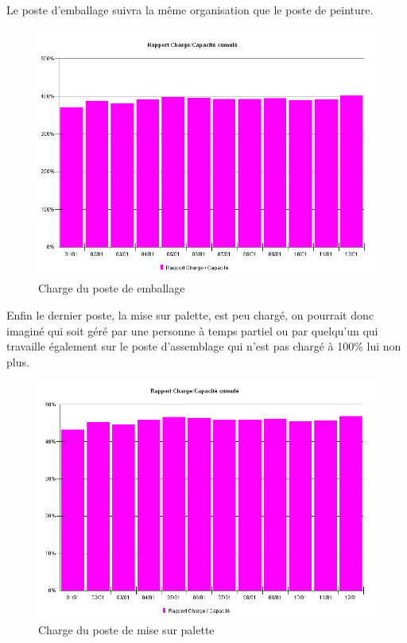 \documentclass[a4paper]{../TPInsa}
\begin{document}
	Le poste d'emballage suivra la même organisation que le poste de peinture. 
	\begin{figure}[H]
	\centering
	\includegraphics[scale=0.6]{captures/charge_emb.PNG}
	\caption{Charge du poste de emballage}
	\end{figure}
	
	Enfin le dernier poste, la mise sur palette, est peu chargé, on pourrait donc imaginé qui soit géré par une personne à temps partiel ou par quelqu'un qui travaille également sur le poste d'assemblage qui n'est pas chargé à 100\% lui non plus.
	\begin{figure}[H]
	\centering
	\includegraphics[scale=0.6]{captures/charge_pal.PNG}
	\caption{Charge du poste de mise sur palette}
	\end{figure}
\end{document}
